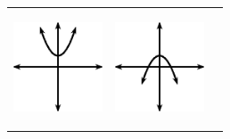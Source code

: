 \begin{center}
\begin{xtabular*}{\mytablewidth}[t]{|p{10\mystarwidth}|p{10\mystarwidth}|p{10\mystarwidth}|}
                  
    \setcounter{subfigure}{0}

\label{m39345*id241967}
    \begin{center}
    \label{m39345*id241967!!!underscore!!!media}\label{m39345*id241967!!!underscore!!!printimage}\includegraphics[width=100px]{col11306.imgs/m39345_MG10C11_015.png} %
        
      \vspace{2pt}
    \vspace{.1in}
    
    \end{center}



    \addtocounter{footnote}{-0}
    
                 &
    
    
        
                  
    \setcounter{subfigure}{0}

\label{m39345*id241979}
    \begin{center}
    \label{m39345*id241979!!!underscore!!!media}\label{m39345*id241979!!!underscore!!!printimage}\includegraphics[width=100px]{col11306.imgs/m39345_MG10C11_016.png} %
        
      \vspace{2pt}
    \vspace{.1in}
    
    \end{center}



    \addtocounter{footnote}{-0}
    
     \tabularnewline{}
    

\end{xtabular*}
\end{center}
